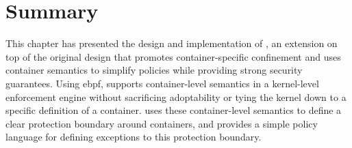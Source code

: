 

\section{Summary}%
\label{s:bpfcontain-summary}

This chapter has presented the design and implementation of \bpfcontain{}, an extension on
top of the original \bpfbox{} design that promotes container-specific confinement and uses
container semantics to simplify policies while providing strong security guarantees.
Using \gls{ebpf}, \bpfcontain{} supports container-level semantics in a kernel-level
enforcement engine without sacrificing adoptability or tying the kernel down to a specific
definition of a container. \bpfcontain{} uses these container-level semantics to define
a clear protection boundary around containers, and provides a simple policy language for
defining exceptions to this protection boundary.
